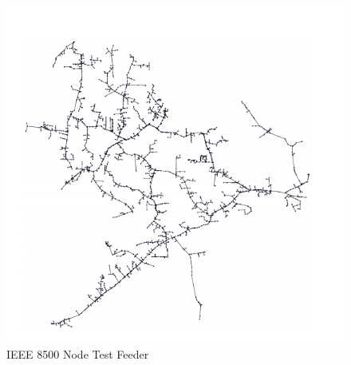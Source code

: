\begin{figure}
    \centering
    \includegraphics[scale=0.5]{_chapter2/fig/ieee8500.png}
    \caption{IEEE 8500 Node Test Feeder}
    \label{ch2:fig:8500bus}
\end{figure}